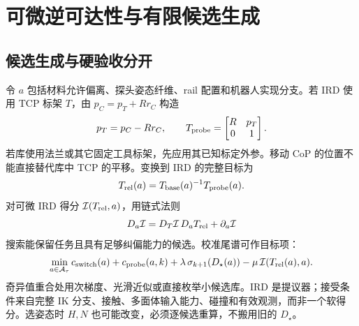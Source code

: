 \documentclass[11pt,a4paper]{article}
\numberwithin{equation}{section}
\theoremstyle{definition}
\begin{document}
\section{可微逆可达性与有限候选生成}
\subsection{候选生成与硬验收分开}
令 $a$ 包括材料允许偏离、探头姿态纤维、rail 配置和机器人实现分支。若 IRD 使用 TCP 标架 $T$，由 $p_C=p_T+Rr_C$ 构造
\begin{equation}
 p_T=p_C-Rr_C,\qquad
 T_{\rm probe}=\begin{bmatrix}R&p_T\\0&1\end{bmatrix}.
\end{equation}
若库使用法兰或其它固定工具标架，先应用其已知标定外参。移动 CoP 的位置不能直接替代库中 TCP 的平移。变换到 IRD 的完整目标为
\begin{equation}
 T_{\rm rel}(a)=T_{\rm base}(a)^{-1}T_{\rm probe}(a).
\end{equation}
对可微 IRD 得分 $\mathcal I(T_{\rm rel},a)$，用链式法则
\begin{equation}
 D_a\mathcal I=D_T\mathcal I\,D_aT_{\rm rel}+\partial_a\mathcal I
\end{equation}
搜索能保留任务且具有足够纠偏能力的候选。校准尾谱可作目标项：
\begin{equation}
 \min_{a\in\mathcal A_\tau}
 c_{\rm switch}(a)+c_{\rm probe}(a,k)
 +\lambda\,\sigma_{k+1}(D_\star(a))
 -\mu\,\mathcal I(T_{\rm rel}(a),a).
\end{equation}
奇异值重合处用次梯度、光滑近似或直接枚举小候选库。IRD 是提议器；接受条件来自完整 IK 分支、接触、多面体输入能力、碰撞和有效观测，而非一个软得分。选姿态时 $H,N$ 也可能改变，必须逐候选重算，不搬用旧的 $D_\star$。
\end{document}
